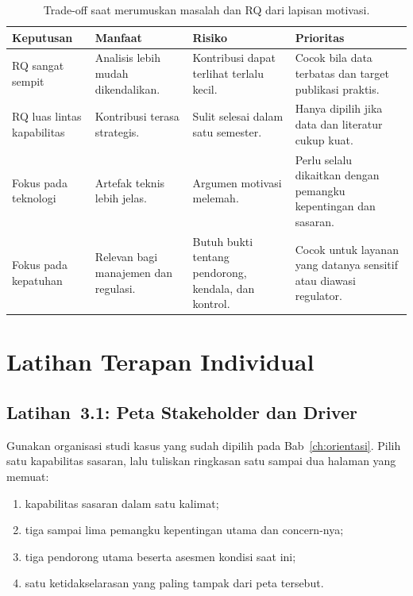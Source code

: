 \begin{table}[htbp]
\centering
\scriptsize
\caption{Trade-off saat merumuskan masalah dan RQ dari lapisan motivasi.}
\label{tab:tradeoff-rq}
\begin{tabularx}{\textwidth}{@{}p{} X X X@{}}
\hline
\textbf{Keputusan} & \textbf{Manfaat} & \textbf{Risiko} & \textbf{Prioritas} \\
\hline
RQ sangat sempit & Analisis lebih mudah dikendalikan. & Kontribusi dapat
terlihat terlalu kecil. & Cocok bila data terbatas dan target publikasi
praktis. \\
RQ luas lintas kapabilitas & Kontribusi terasa strategis. & Sulit selesai dalam
satu semester. & Hanya dipilih jika data dan literatur cukup kuat. \\
Fokus pada teknologi & Artefak teknis lebih jelas. & Argumen motivasi melemah.
& Perlu selalu dikaitkan dengan pemangku kepentingan dan sasaran. \\
Fokus pada kepatuhan & Relevan bagi manajemen dan regulasi. & Butuh bukti
tentang pendorong, kendala, dan kontrol. & Cocok untuk layanan yang datanya
sensitif atau diawasi regulator. \\
\hline
\end{tabularx}
\end{table}

\section{Latihan Terapan Individual}

\subsection*{Latihan~3.1: Peta Stakeholder dan Driver}

Gunakan organisasi studi kasus yang sudah dipilih pada Bab~\ref{ch:orientasi}.
Pilih satu kapabilitas sasaran, lalu tuliskan ringkasan satu sampai dua halaman
yang memuat:

\begin{enumerate}
  \item kapabilitas sasaran dalam satu kalimat;
  \item tiga sampai lima pemangku kepentingan utama dan concern-nya;
  \item tiga pendorong utama beserta asesmen kondisi saat ini;
  \item satu ketidakselarasan yang paling tampak dari peta tersebut.
\end{enumerate}

